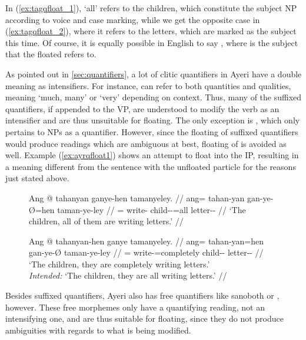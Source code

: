 In (\ref{ex:tagqfloat_1}),  `all' refers to the children, which
constitute the subject NP according to voice and case marking, while we get the
opposite case in (\ref{ex:tagqfloat_2}), where it refers to the letters, which
are marked as the subject this time. Of course, it is equally possible in
English to say , where  is the subject that the floated  refers to.

As pointed out in \autoref{sec:quantifiers}, a lot of clitic quantifiers in
Ayeri have a double meaning as intensifiers. For instance, 
can refer to both quantities and qualities, meaning `much, many' or `very'
depending on context. Thus, many of the suffixed quantifiers, if appended to
the VP, are understood to modify the verb as an intensifier and are thus
unsuitable for floating. The only exception is ,
which only pertains to NPs as a quantifier. However, since the floating of
suffixed quantifiers would produce readings which are ambiguous at best,
floating of  is avoided as well. Example
(\ref{ex:ayrqfloat1}) shows an attempt to float  into
the IP, resulting in a meaning different from the sentence with the unfloated
particle for the reasons just stated above.

\begin{figure}[t]
\pex\label{ex:ayrqfloat1}
\a\label{ex:ayrqfloat1_1}\begingl
	\gla Ang @ tahanyan ganye-hen tamanyeley. //
	\glb ang= tahan-yan gan-ye-Ø=hen taman-ye-ley //
	\glc \AgtT{}= write-\TplM{} child-\Pl{}-\Top{}=all letter-\Pl{}-\PargI{} //
	\glft `The children, all of them are writing letters.' //
\endgl

\a\label{ex:ayrqfloat1_2}\ljudge\excl\begingl
	\gla Ang @ tahanyan-hen ganye tamanyeley. //
	\glb ang= tahan-yan=hen gan-ye-Ø taman-ye-ley //
	\glc \AgtT{}= write-\TplM{}=completely child-\Pl{}-\Top{}
		letter-\Pl{}-\PargI{} //
	\glft `The children, they are completely writing letters.'\\
		\textit{Intended:} `The children, they are all writing letters.' //
\endgl

\xe
\end{figure}

Besides suffixed quantifiers, Ayeri also has free quantifiers like 
{sano}{both} or , however. These free morphemes
only have a quantifying reading, not an intensifying one, and are thus suitable
for floating, since they do not produce ambiguities with regards to
what is being modified.

